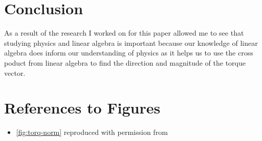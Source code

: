 \documentclass{turabian-researchpaper}
\begin{document}
\section{Conclusion} 

As a result of the research I worked on for this paper allowed me to see that studying physics and linear algebra is important because our knowledge of linear algebra does inform our understanding of physics as it helps us to use the cross poduct from linear algebra to find the direction and magnitude of the torque vector. \\ 


 

\section*{References to Figures} 

\begin{itemize}
    \item \cref{fig:torq-norm} reproduced with permission from \cite{torquekhanacademy2024}  
\end{itemize}    
\end{document}
